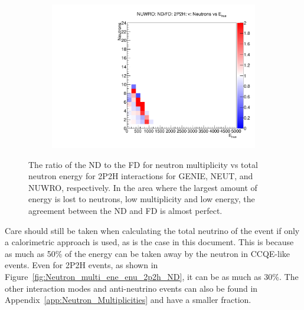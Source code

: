 \documentclass[12pt]{article}
\begin{document}
\begin{figure}
\begin{subfigure}[b]{0.32\textwidth}
  \includegraphics[width=\textwidth]{nneutrons_v_total_ene/Nneutrons_Total_ENe_2p2h_NUWRO_ND_FD_numu_norm.pdf}
\end{subfigure}
\caption{The ratio of the ND to the FD for neutron multiplicity vs total neutron energy for 2P2H interactions for GENIE, NEUT, and NUWRO, respectively.  In the area where the largest amount of energy is lost to neutrons, low multiplicity and low energy, the agreement between the ND and FD is almost perfect.} 
\label{fig:Neutron_multi_2p2h_ND_FD}
\end{figure}
Care should still be taken when calculating the total neutrino of the event if only a calorimetric approach is used, as is the case in this document.
This is because as much as 50\% of the energy can be taken away by the neutron in CCQE-like events.
Even for 2P2H events, as shown in Figure~\ref{fig:Neutron_multi_ene_enu_2p2h_ND}, it can be as much as 30\%.
The other interaction modes and anti-neutrino events can also be found in Appendix~\ref{app:Neutron_Multiplicities} and have a smaller fraction.
\end{document}
